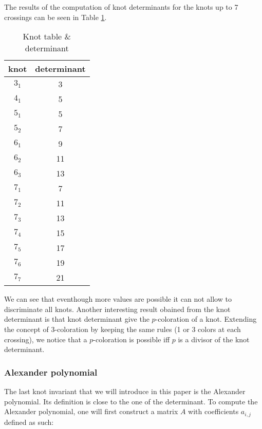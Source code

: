 \documentclass[12pt, a4paper]{article}
\begin{document}
The results of the computation of knot determinants for the knots up to 7 crossings can be seen in Table \ref{tab:knot_determinant}.

\begin{table}[H]
\begin{center}
  \begin{tabular}{| c | c |}
    \hline
    knot & determinant\\
    \hline
    $3_1$ & 3\\
    \hline
    $4_1$ & 5\\
    \hline
    $5_1$ & 5\\
    \hline
    $5_2$ & 7\\
    \hline
    $6_1$ & 9\\
    \hline
    $6_2$ & 11\\
    \hline
    $6_3$ & 13\\
    \hline
    $7_1$ & 7\\
    \hline
    $7_2$ & 11\\
    \hline
    $7_3$ & 13\\
    \hline
    $7_4$ & 15\\
    \hline
    $7_5$ & 17\\
    \hline
    $7_6$ & 19\\
    \hline
    $7_7$ & 21\\
    \hline
  \end{tabular}
\end{center}
  \caption{Knot table \& determinant}
\label{tab:knot_determinant}
\end{table}

We can see that eventhough more values are possible it can not allow to discriminate all knots. Another interesting result obained from the knot determinant is that knot determinant give the $p$-coloration of a knot. Extending the concept of $3$-coloration by keeping the same rules (1 or 3 colors at each crossing), we notice that a $p$-coloration is possible iff $p$ is a divisor of the knot determinant.

\subsubsection{Alexander polynomial}

The last knot invariant that we will introduce in this paper is the Alexander polynomial. Its definition is close to the one of the determinant. To compute the Alexander polynomial, one will first construct a matrix $A$ with coefficients $a_{i,j}$ defined as such: 
\end{document}
